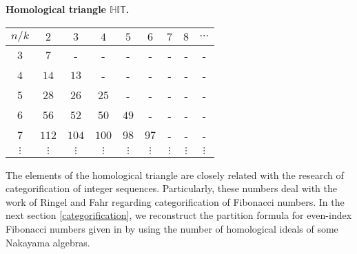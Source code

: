 \documentclass[10pt,twoside]{article}
\theoremstyle{definition}
\begin{document}
\begin{center}
\textbf{ Homological triangle $\mathbb{HIT}$.}
\vspace{0.5cm}  

\begin{tabular}{|c|c|c|c|c|c|c|c|c|}
\hline
$n/k$ & $2$ & $3$ & $4$ & $5$ & $6$ & $7$ & $8$ &$\cdots$\\
\hline
$3$ & $7$ & - & - & - & - & - & - & -\\
\hline
$4$& $14$ & $13$  & - & - & - & - & - &-\\
\hline
$5$ & $28$ & $26$ & $25$  & - & - & - & - &-\\
\hline
$6$& $56$ & $52$ & $50$ & $49$ & - & - & - &-\\
\hline
$7$ & $112$ & $104$ & $100$ & $98$ & $97$ & - & - &-\\
\hline
$\vdots $& $\vdots$ & $\vdots $ & $\vdots $ & $\vdots $ & $\vdots $ & $\vdots $ & $\vdots$& $\vdots$\\

\hline
\end{tabular}
\vspace{0.5cm}

\end{center}

The elements of the homological triangle are closely related with the research of categorification of integer sequences. Particularly, these numbers deal with the work of Ringel and Fahr regarding categorification of Fibonacci numbers. In the next section \ref{categorification}, we reconstruct the partition formula for even-index Fibonacci numbers given in \cite{Fahr1,Fahr3} by using the number of homological ideals of some Nakayama algebras.
\end{document}
